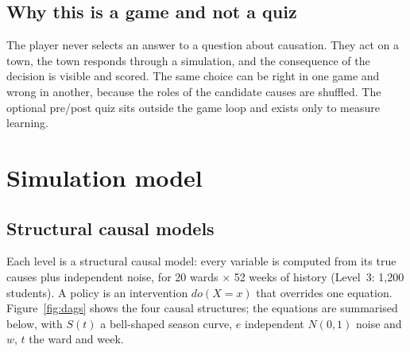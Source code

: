 \documentclass[11pt,a4paper]{article}
\begin{document}
\subsection{Why this is a game and not a quiz}
The player never selects an answer to a question about causation. They act on a town, the town responds through a
simulation, and the consequence of the decision is visible and scored. The same choice can be right in one game and wrong
in another, because the roles of the candidate causes are shuffled. The optional pre/post quiz sits outside the game loop
and exists only to measure learning.

\section{Simulation model}
\subsection{Structural causal models}
Each level is a structural causal model: every variable is computed from its true causes plus independent noise, for
20 wards $\times$ 52 weeks of history (Level~3: 1{,}200 students). A policy is an intervention $do(X=x)$ that overrides
one equation. Figure~\ref{fig:dags} shows the four causal structures; the equations are summarised below, with
$S(t)$ a bell-shaped season curve, $e$ independent $N(0,1)$ noise and $w$, $t$ the ward and week.
\end{document}
